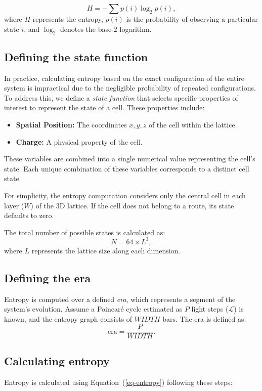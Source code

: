 \documentclass[12pt,english]{article}
\begin{document}
\begin{equation}
H = -\sum p(i) \log_2 p(i),
\label{eq-entropy}
\end{equation}
where \( H \) represents the entropy, \( p(i) \) is the probability of observing a particular state \( i \), and \( \log_2 \) denotes the base-2 logarithm.

\subsection{Defining the state function}
In practice, calculating entropy based on the exact configuration of the entire system is impractical due to the negligible probability of repeated configurations. To address this, we define a \textit{state function} that selects specific properties of interest to represent the state of a cell. These properties include:

\begin{itemize}
    \item \textbf{Spatial Position:} The coordinates \( x, y, z \) of the cell within the lattice.
    \item \textbf{Charge:} A physical property of the cell.
\end{itemize}

These variables are combined into a single numerical value representing the cell's state. Each unique combination of these variables corresponds to a distinct cell state. 

For simplicity, the entropy computation considers only the central cell in each layer (\( W \)) of the 3D lattice. If the cell does not belong to a route, its state defaults to zero.

The total number of possible states is calculated as:
\begin{equation}
N = 64 \times L^3,
\label{eq-nstates}
\end{equation}
where \( L \) represents the lattice size along each dimension.

\subsection{Defining the era}
Entropy is computed over a defined \textit{era}, which represents a segment of the system's evolution. Assume a Poincaré cycle estimated as \( P \) light steps (\( \mathcal{L} \)) is known, and the entropy graph consists of \( WIDTH \) bars. The era is defined as:
\[
\text{era} = \frac{P}{WIDTH}.
\]

\subsection{Calculating entropy}
Entropy is calculated using Equation~(\ref{eq-entropy}) following these steps:
\end{document}
